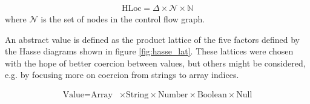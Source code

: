 \begin{align}
\text{HLoc}  = \Delta \times \mathcal{N} \times \mathbb{N}
\end{align}
where $\mathcal{N}$ is the set of nodes in the control flow graph. 

An abstract value is defined as the product lattice of the five factors defined by the Hasse diagrams shown in figure \ref{fig:hasse_lat}. These lattices were chosen with the hope of better coercion between values, but others might be considered, e.g. by focusing more on coercion from strings to array indices.

\begin{align}
\text{Value} = \text{Array} & \times \text{String} \times \text{Number} \times \text{Boolean}  \times \text{Null}
\end{align}

